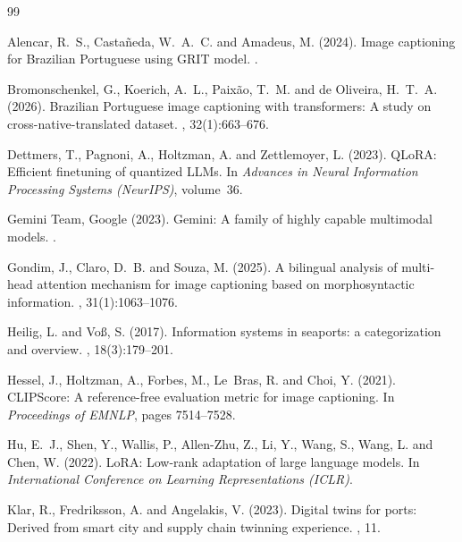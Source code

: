 \begin{thebibliography}{99}

Alencar, R.~S., Castañeda, W.~A.~C. and Amadeus, M. (2024).
\newblock Image captioning for Brazilian Portuguese using GRIT model.
.

Bromonschenkel, G., Koerich, A.~L., Paixão, T.~M. and de Oliveira, H.~T.~A. (2026).
\newblock Brazilian Portuguese image captioning with transformers: A study on cross-native-translated dataset.
, 32(1):663--676.

Dettmers, T., Pagnoni, A., Holtzman, A. and Zettlemoyer, L. (2023).
\newblock QLoRA: Efficient finetuning of quantized LLMs.
\newblock In {\em Advances in Neural Information Processing Systems (NeurIPS)}, volume~36.

Gemini Team, Google (2023).
\newblock Gemini: A family of highly capable multimodal models.
.

Gondim, J., Claro, D.~B. and Souza, M. (2025).
\newblock A bilingual analysis of multi-head attention mechanism for image captioning based on morphosyntactic information.
, 31(1):1063--1076.

Heilig, L. and Vo{\ss}, S. (2017).
\newblock Information systems in seaports: a categorization and overview.
, 18(3):179--201.

Hessel, J., Holtzman, A., Forbes, M., Le~Bras, R. and Choi, Y. (2021).
\newblock CLIPScore: A reference-free evaluation metric for image captioning.
\newblock In {\em Proceedings of EMNLP}, pages 7514--7528.

Hu, E.~J., Shen, Y., Wallis, P., Allen-Zhu, Z., Li, Y., Wang, S., Wang, L. and Chen, W. (2022).
\newblock LoRA: Low-rank adaptation of large language models.
\newblock In {\em International Conference on Learning Representations (ICLR)}.

Klar, R., Fredriksson, A. and Angelakis, V. (2023).
\newblock Digital twins for ports: Derived from smart city and supply chain twinning experience.
, 11.


\end{thebibliography}
